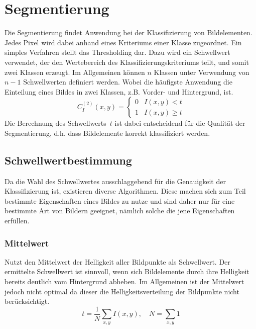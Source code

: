 \section{Segmentierung}
\writtenby{\dcauthornameewie}%
Die Segmentierung findet Anwendung bei der Klassifizierung von Bildelementen.
Jedes Pixel wird dabei anhand eines Kriteriums einer Klasse zugeordnet.
Ein simples Verfahren stellt das Thresholding dar.
Dazu wird ein Schwellwert verwendet, der den Wertebereich des Klassifizierungskriteriums teilt, und somit zwei Klassen erzeugt.
Im Allgemeinen können $n$ Klassen unter Verwendung von $n-1$ Schwellwerten definiert werden.
Wobei die häufigste Anwendung die Einteilung eines Bildes in zwei Klassen, z.B. Vorder- und Hintergrund, ist.
\begin{equation}
  C_I^{(2)}(x,y) = \begin{cases}
    0 & I(x,y) <    t \\
    1 & I(x,y) \geq t
  \end{cases}
\end{equation}
Die Berechnung des Schwellwerts~$t$ ist dabei entscheidend für die Qualität der Segmentierung, d.h. dass Bildelemente korrekt klassifiziert werden.

\subsection*{Schwellwertbestimmung}
Da die Wahl des Schwellwertes ausschlaggebend für die Genauigkeit der Klassifizierung ist, existieren diverse Algorithmen.
Diese machen sich zum Teil bestimmte Eigenschaften eines Bildes zu nutze und sind daher nur für eine bestimmte Art von Bildern geeignet, nämlich solche die jene Eigenschaften erfüllen.

\subsubsection*{Mittelwert}
Nutzt den Mittelwert der Helligkeit aller Bildpunkte als Schwellwert.
Der ermittelte Schwellwert ist sinnvoll, wenn sich Bildelemente durch ihre Helligkeit bereits deutlich vom Hintergrund abheben.
Im Allgemeinen ist der Mittelwert jedoch nicht optimal da dieser die Helligkeitsverteilung der Bildpunkte nicht berücksichtigt.
\begin{equation}
  t = \frac{1}{N} \sum_{x,y} I(x,y), \quad N = \sum_{x,y} 1
\end{equation}

